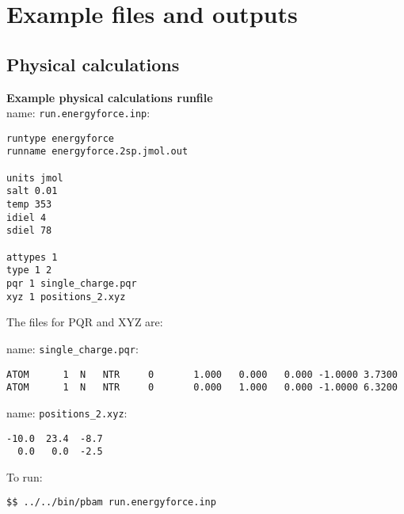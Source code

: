 
\clearpage




\section{Example files and outputs}

\subsection{Physical calculations}

\textbf{Example physical calculations runfile} \\

name:  \texttt{run.energyforce.inp}:
\begin{lstlisting}[style = MyBash]
runtype energyforce
runname energyforce.2sp.jmol.out

units jmol
salt 0.01
temp 353
idiel 4 
sdiel 78

attypes 1
type 1 2
pqr 1 single_charge.pqr
xyz 1 positions_2.xyz
\end{lstlisting}
\medskip

The files for PQR and XYZ are: 

name:  \texttt{single\_charge.pqr}:
\begin{lstlisting}[style = MyBash]
ATOM      1  N   NTR     0       1.000   0.000   0.000 -1.0000 3.7300
ATOM      1  N   NTR     0       0.000   1.000   0.000 -1.0000 6.3200
\end{lstlisting}

\medskip

name:  \texttt{positions\_2.xyz}:
\begin{lstlisting}[style = MyBash]
-10.0  23.4  -8.7
  0.0   0.0  -2.5
\end{lstlisting}
\medskip

To run: 
\begin{lstlisting}[style = MyBash]
$$ ../../bin/pbam run.energyforce.inp
\end{lstlisting}
\medskip

